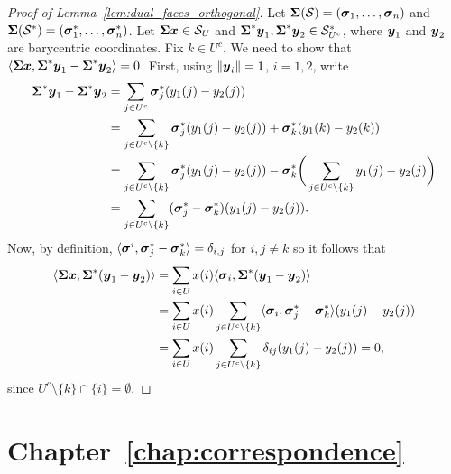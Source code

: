 \begin{proof}[Proof of Lemma~\ref{lem:dual_faces_orthogonal}]
	Let $\boldsymbol{\Sigma}(\mathcal{S})=(\vb*{\sigma}_1,\dots,\vb*{\sigma}_n)$ and $\boldsymbol{\Sigma}(\mathcal{S}^*)=(\vb*{\sigma}^*_1,\dots,\vb*{\sigma}^*_n)$.  Let $\boldsymbol{\Sigma}\vb*{x}\in \mathcal{S}_U$ and $\boldsymbol{\Sigma}^*\vb*{y}_1,\boldsymbol{\Sigma}^*\vb*{y}_2\in \mathcal{S}^*_{U^c}$, where $\vb*{y}_1$ and $\vb*{y}_2$ are barycentric coordinates. Fix $k\in U^c$. We need to show that $\langle \boldsymbol{\Sigma}\vb*{x},\boldsymbol{\Sigma}^*\vb*{y}_1-\boldsymbol{\Sigma}^*\vb*{y}_2\rangle =0$. First, using $\norm{\vb*{y}_i}=1$, $i=1,2$, write
	\begin{align*}
	\boldsymbol{\Sigma}^*\vb*{y}_1 - \boldsymbol{\Sigma}^*\vb*{y}_2 &= \sum_{j\in U^c} \vb*{\sigma}^*_j(y_1(j)-y_2(j)) \\
	&=\sum_{j\in U^c\setminus \{k\}} \vb*{\sigma}^*_j(y_1(j)-y_2(j)) + \vb*{\sigma}^*_k(y_1(k)-y_2(k)) \\
	&= \sum_{j\in U^c\setminus\{k\}}\vb*{\sigma}^*_j(y_1(j)-y_2(j))  -\vb*{\sigma}^*_k\bigg(\sum_{j\in U^c\setminus \{k\}} y_1(j)-y_2(j)\bigg) \\
	&= \sum_{j\in U^c\setminus\{k\}} (\vb*{\sigma}^*_j-\vb*{\sigma}^*_k)(y_1(j)-y_2(j)). 
	\end{align*}
	Now, by definition, $\langle \vb*{\sigma}^i,\vb*{\sigma}^*_j-\vb*{\sigma}^*_k\rangle = \delta_{i,j}$ for $i,j\neq k$ so it follows that 
	\begin{align*}
	\langle \boldsymbol{\Sigma}\vb*{x},\boldsymbol{\Sigma}^*(\vb*{y}_1-\vb*{y}_2)\rangle &= \sum_{i\in U} x(i)\langle \vb*{\sigma}_i,\boldsymbol{\Sigma}^*(\vb*{y}_1-\vb*{y}_2)\rangle \\
	&= \sum_{i\in U}x(i)\sum_{j\in U^c\setminus \{k\}} \langle \vb*{\sigma}_i,\vb*{\sigma}^*_j-\vb*{\sigma}^*_k\rangle (y_1(j)-y_2(j)) \\
	&=\sum_{i\in U} x(i) \sum_{j\in U^c\setminus\{k\}} \delta_{ij}(y_1(j)-y_2(j)) = 0, 
	\end{align*}
	since $U^c\setminus\{k\}\cap\{i\}=\emptyset$. 
\end{proof}

\section{Chapter~\ref{chap:correspondence}}
\label{sec:app_proofs_correspondence}

